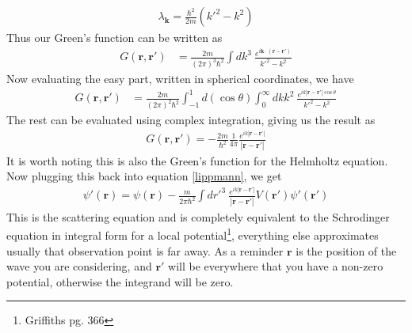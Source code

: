 \begin{align}
\lambda_\textbf{k} = \frac{\hbar^2}{2m}(k'^2-k^2)
\end{align}
Thus our Green's function can be written as
\begin{align}
G(\textbf{r},\textbf{r}') &= \frac{2m}{(2\pi)^3\hbar^2}\int dk^3 ~\frac{e^{i\textbf{k}\cdot(\textbf{r}-\textbf{r}')}}{k'^2-k^2}
\end{align}
Now evaluating the easy part, written in spherical coordinates, we have
\begin{align}
G(\textbf{r},\textbf{r}') &= \frac{2m}{(2\pi)^2\hbar^2}\int_{-1}^1 d(\cos\theta) \int_0^\infty dk k^2 ~\frac{e^{ik|\textbf{r}-\textbf{r}'|\cos\theta}}{k'^2-k^2}
\end{align}
The rest can be evaluated using complex integration, giving us the result as
\begin{align}
G(\textbf{r},\textbf{r}') = -\frac{2m}{\hbar^2}\frac{1}{4\pi} \frac{e^{ik|\textbf{r}-\textbf{r}'|}}{|\textbf{r}-\textbf{r}'|}
\end{align}
It is worth noting this is also the Green's function for the Helmholtz equation. Now plugging this back into equation \ref{lippmann}, we get
\begin{align}\label{scat}
\boxed{\psi'(\textbf{r}) = \psi(\textbf{r})  -\frac{m}{2\pi\hbar^2}\int dr'^3~ \frac{e^{ik|\textbf{r}-\textbf{r}'|}}{|\textbf{r}-\textbf{r}'|} V(\textbf{r}')\psi'(\textbf{r}')}
\end{align}
This is the scattering equation and is completely equivalent to the Schrodinger equation in integral form for a local potential\footnote{Griffiths pg. 366}, everything else approximates usually that observation point is far away. As a reminder $\textbf{r}$ is the position of the wave you are considering, and $\textbf{r}'$ will be everywhere that you have a non-zero potential, otherwise the integrand will be zero.


